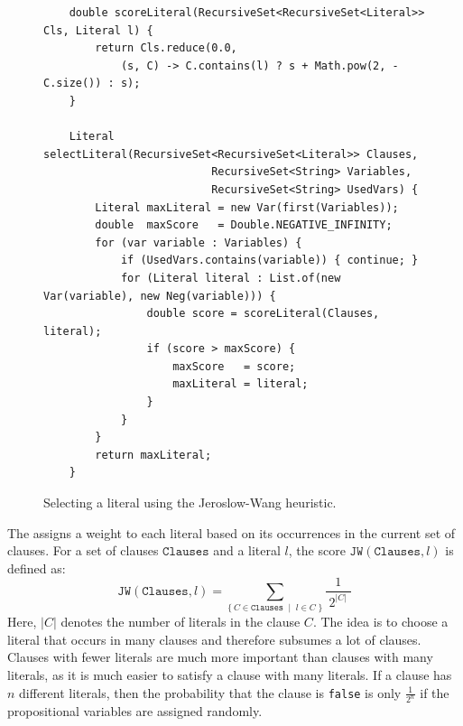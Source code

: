 \begin{figure}[!ht]
  \centering
\begin{verbatim}
    double scoreLiteral(RecursiveSet<RecursiveSet<Literal>> Cls, Literal l) {
        return Cls.reduce(0.0,
            (s, C) -> C.contains(l) ? s + Math.pow(2, -C.size()) : s);
    }
    
    Literal selectLiteral(RecursiveSet<RecursiveSet<Literal>> Clauses,
                          RecursiveSet<String> Variables,
                          RecursiveSet<String> UsedVars) {
        Literal maxLiteral = new Var(first(Variables));
        double  maxScore   = Double.NEGATIVE_INFINITY;
        for (var variable : Variables) {
            if (UsedVars.contains(variable)) { continue; }
            for (Literal literal : List.of(new Var(variable), new Neg(variable))) {
                double score = scoreLiteral(Clauses, literal);
                if (score > maxScore) {
                    maxScore   = score;
                    maxLiteral = literal;
                }
            }
        }
        return maxLiteral;
    }
\end{verbatim}
\vspace*{-0.3cm}
  \caption{Selecting a literal using the Jeroslow-Wang heuristic.}
  \label{fig:selectLiteral}
\end{figure}
The  assigns a weight to each literal based on its occurrences in the current set of clauses. For a set of clauses $\texttt{Clauses}$ and a literal $l$, the score $\texttt{JW}(\texttt{Clauses}, l)$ is defined as:
$$ \texttt{JW}(\texttt{Clauses}, l) = \sum\limits_{\bigl\{\,C \in \texttt{Clauses}\;\mid\; l \in C\;\bigr\}} \frac{1}{\;2^{|C|}\;} $$
Here, $|C|$ denotes the number of literals in the clause $C$.
The idea is to choose a literal that occurs in many clauses and therefore subsumes a lot of clauses.  Clauses
with fewer literals are much more important than clauses with many literals, as it is much easier to satisfy a
clause with many literals.  If a clause has $n$ different literals, then the probability that the clause is
\texttt{false} is only $\displaystyle\frac{1}{2^n}$ if the propositional variables are assigned randomly. 


